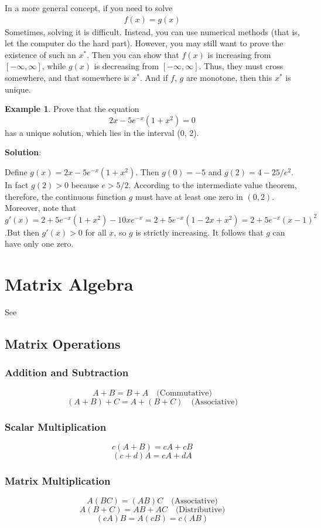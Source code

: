 \documentclass[11pt,a4paper]{book}
\theoremstyle{definition}\newtheorem{definition}{Definition}
\theoremstyle{definition}\newtheorem{fact}{Fact}
\theoremstyle{definition}\newtheorem{remark}{Remark}
\theoremstyle{definition}\newtheorem{ex}{Ex.}
\theoremstyle{definition}\newtheorem{project}{Project}
\theoremstyle{definition}\newtheorem{problem}{Problem}
\theoremstyle{definition}\newtheorem{example}{Example}
\numberwithin{theorem}{section}
\numberwithin{corollary}{chapter}
\numberwithin{assumption}{chapter}
\numberwithin{definition}{chapter}
\numberwithin{prop}{chapter}
\numberwithin{notation}{chapter}
\numberwithin{problem}{chapter}
\numberwithin{example}{chapter}
\numberwithin{fact}{chapter}
\numberwithin{ex}{chapter}
\begin{document}
\begin{appendices}
	In a more general concept, if you need to solve
	\begin{align*}
		f(x) = g(x)
	\end{align*}
	Sometimes, solving it is difficult. Instead, you can use numerical methods (that is, let the computer do the hard part). However, you may still want to prove the existence of such an $x^*$. Then you can show that $f(x)$ is increasing from $[-\infty,\infty]$, while $g(x)$ is decreasing from $[-\infty,\infty]$. Thus, they must cross somewhere, and that somewhere is $x^*$. And if $f$, $g$ are monotone, then this $x^*$ is unique.
	
	\begin{example}
		Prove that the equation
		$$2x - 5e^{-x}(1+x^2)=0$$
		has a unique solution, which lies in the interval (0, 2).
		
		\textbf{Solution}:
		
		Define $g(x) = 2x - 5e^{-x}(1 + x^2)$. Then $g(0) = -5$ and $g(2) = 4 - 25/e^2$. In fact $g(2) > 0$ because $e > 5/2$. According to the intermediate value theorem, therefore, the continuous function $g$ must have at least one zero in $(0, 2)$. Moreover, note that $g'(x) = 2 + 5e^{-x}(1+x^2)-10xe^{-x} =2+5e^{-x}(1-2x+x^2)=2+5e^{-x}(x-1)^2$.But then $g'(x)>0$ for all $x$, so $g$ is strictly increasing. It follows that $g$ can have only one zero.
	\end{example}
	
	\section{Matrix Algebra}
	See \citet[Ch. 9]{springcamp}
	\subsection{Matrix Operations}
	
	\subsubsection*{Addition and Subtraction}
	\[
	A + B = B + A \quad \text{(Commutative)}
	\]
	\[
	(A + B) + C = A + (B + C) \quad \text{(Associative)}
	\]
	
	\subsubsection*{Scalar Multiplication}
	\[
	c(A + B) = cA + cB
	\]
	\[
	(c + d)A = cA + dA
	\]
	
	\subsubsection*{Matrix Multiplication}
	\[
	A(BC) = (AB)C \quad \text{(Associative)}
	\]
	\[
	A(B + C) = AB + AC \quad \text{(Distributive)}
	\]
	\[
	(cA)B = A(cB) = c(AB)
	\]

\end{appendices}
\end{document}

